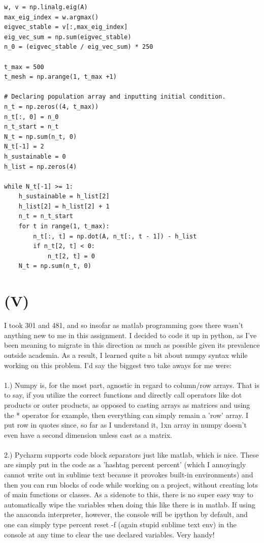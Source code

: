 \documentclass{article}
\begin{document}
\begin{lstlisting}
w, v = np.linalg.eig(A)
max_eig_index = w.argmax()
eigvec_stable = v[:,max_eig_index]
eig_vec_sum = np.sum(eigvec_stable)
n_0 = (eigvec_stable / eig_vec_sum) * 250

t_max = 500
t_mesh = np.arange(1, t_max +1)

# Declaring population array and inputting initial condition.
n_t = np.zeros((4, t_max))
n_t[:, 0] = n_0
n_t_start = n_t
N_t = np.sum(n_t, 0)
N_t[-1] = 2
h_sustainable = 0
h_list = np.zeros(4)

while N_t[-1] >= 1:
    h_sustainable = h_list[2]
    h_list[2] = h_list[2] + 1
    n_t = n_t_start
    for t in range(1, t_max):
        n_t[:, t] = np.dot(A, n_t[:, t - 1]) - h_list
        if n_t[2, t] < 0:
            n_t[2, t] = 0
    N_t = np.sum(n_t, 0)
 \end{lstlisting}

 \section*{\textbf{(V)}}
 I took 301 and 481, and so insofar as matlab programming goes there wasn't anything new to me in this assignment. I decided to code it up in python, as I've been meaning to migrate in this direction as much as possible given its prevalence outside academia. As a result, I learned quite a bit about numpy syntax while working on this problem. I'd say the biggest two take aways for me were:\\
 \\
 1.) Numpy is, for the most part, agnostic in regard to column/row arrays. That is to say, if you utilize the correct functions and directly call operators like dot products or outer products, as opposed to casting arrays as matrices and using the * operator for example, then everything can simply remain a 'row' array. I put row in quotes since, so far as I understand it, 1xn array in numpy doesn't even have a second dimension unless cast as a matrix.\\
 \\
 2.) Pycharm supports code block separators just like matlab, which is nice. These are simply put in the code as a 'hashtag percent percent' (which I annoyingly cannot write out in sublime text because it provokes built-in environments) and then you can run blocks of code while working on a project, without creating lots of main functions or classes. As a sidenote to this, there is no super easy way to automatically wipe the variables when doing this like there is in matlab. If using the anaconda interpreter, however, the console will be ipython by default, and one can simply type percent reset -f (again stupid sublime text env) in the console at any time to clear the use declared variables. Very handy!
\end{document}
